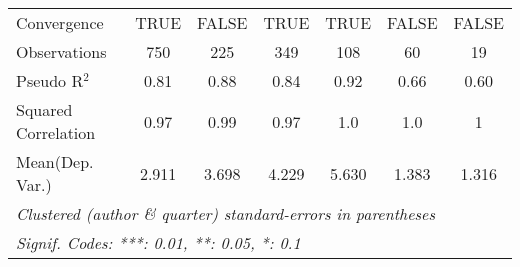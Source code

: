 \begin{tabular}{lcccccc}
   Convergence                                                &TRUE         & FALSE       & TRUE    & TRUE      & FALSE          & FALSE\\  
   Observations                                               & 750         & 225         & 349     & 108       & 60             & 19\\  
   Pseudo R$^2$                                               & 0.81        & 0.88        & 0.84    & 0.92      & 0.66           & 0.60\\  
   Squared Correlation                                        & 0.97        & 0.99        & 0.97    & 1.0       & 1.0            & 1\\  
Mean(Dep. Var.) & 2.911 & 3.698 & 4.229 & 5.630 & 1.383 & 1.316 \\
   \midrule \midrule
   \multicolumn{7}{l}{\emph{Clustered (author \& quarter) standard-errors in parentheses}}\\
   \multicolumn{7}{l}{\emph{Signif. Codes: ***: 0.01, **: 0.05, *: 0.1}}\\
\end{tabular}
\par\endgroup
